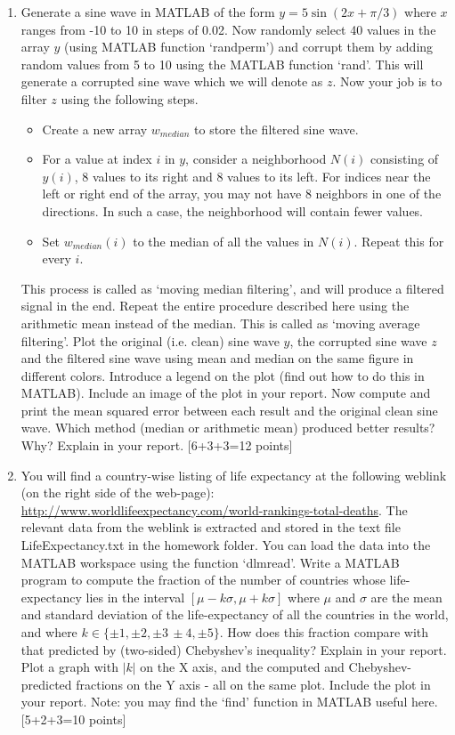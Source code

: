 \documentclass[11pt]{article}
\begin{document}
\begin{enumerate}
\item Generate a sine wave in MATLAB of the form $y = 5 \sin (2x + \pi/3)$ where $x$ ranges from -10 to 10 in steps of 0.02. Now randomly select 40 values in the array $y$ (using MATLAB function `randperm') and corrupt them by adding random values from 5 to 10 using the MATLAB function `rand'. This will generate a corrupted sine wave which we will denote as $z$. Now your job is to filter $z$ using the following steps. 
\begin{itemize}
\item Create a new array $w_{median}$ to store the filtered sine wave.
\item For a value at index $i$ in $y$, consider a neighborhood $N(i)$ consisting of $y(i)$, 8 values to its right and 8 values to its left. For indices near the left or right end of the array, you may not have 8 neighbors in one of the directions. In such a case, the neighborhood will contain fewer values.
\item Set $w_{median}(i)$ to the median of all the values in $N(i)$. Repeat this for every $i$. 
\end{itemize}
This process is called as `moving median filtering', and will produce a filtered signal in the end. Repeat the entire procedure described here using the arithmetic mean instead of the median. This is called as `moving average filtering'. Plot the original (i.e. clean) sine wave $y$, the corrupted sine wave $z$ and the filtered sine wave using mean and median on the same figure in different colors. Introduce a legend on the plot (find out how to do this in MATLAB). Include an image of the plot in your report. Now compute and print the mean squared error between each result and the original clean sine wave. Which method (median or arithmetic mean) produced better results? Why? Explain in your report. \textsf{[6+3+3=12 points]}

\item You will find a country-wise listing of life expectancy at the following weblink (on the right side of the web-page): \url{http://www.worldlifeexpectancy.com/world-rankings-total-deaths}. The relevant data from the weblink is extracted and stored in the text file LifeExpectancy.txt in the homework folder. You can load the data into the MATLAB workspace using the function `dlmread'. Write a MATLAB program to compute the fraction of the number of countries whose life-expectancy lies in the interval $[\mu-k\sigma,\mu+k\sigma]$ where $\mu$ and $\sigma$ are the mean and standard deviation of the life-expectancy of all the countries in the world, and where $k \in \{\pm 1,\pm 2, \pm 3\, \pm 4, \pm 5\}$. How does this fraction compare with that predicted by (two-sided) Chebyshev's inequality? Explain in your report. Plot a graph with $|k|$ on the X axis, and the computed and Chebyshev-predicted fractions on the Y axis - all on the same plot. Include the plot in your report. Note: you may find the `find' function in MATLAB useful here. 
\textsf{[5+2+3=10 points]}


\end{enumerate}
\end{document}
